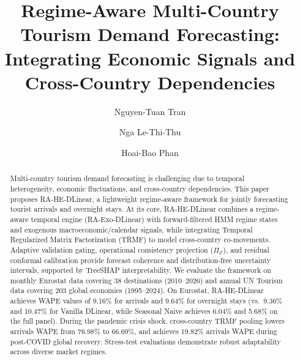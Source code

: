 \documentclass[sigconf]{acmart}
\begin{document}
\title[Regime-Aware Multi-Country Tourism Demand Forecasting]{Regime-Aware Multi-Country Tourism Demand Forecasting: Integrating Economic Signals and Cross-Country Dependencies}

\author{Nguyen-Tuan Tran}

\author{Nga Le-Thi-Thu}

\author{Hoai-Bao Phan}

\renewcommand{\shortauthors}{Tran et al.}

\begin{abstract}
Multi-country tourism demand forecasting is challenging due to temporal heterogeneity, economic fluctuations, and cross-country dependencies. This paper proposes RA-HE-DLinear, a lightweight regime-aware framework for jointly forecasting tourist arrivals and overnight stays. At its core, RA-HE-DLinear combines a regime-aware temporal engine (RA-Exo-DLinear) with forward-filtered HMM regime states and exogenous macroeconomic/calendar signals, while integrating Temporal Regularized Matrix Factorization (TRMF) to model cross-country co-movements. Adaptive validation gating, operational consistency projection ($\Pi_{\mathcal{C}}$), and residual conformal calibration provide forecast coherence and distribution-free uncertainty intervals, supported by TreeSHAP interpretability. We evaluate the framework on monthly Eurostat data covering 38 destinations (2010--2026) and annual UN Tourism data covering 203 global economies (1995--2024). On Eurostat, RA-HE-DLinear achieves WAPE values of 9.16\% for arrivals and 9.64\% for overnight stays (vs.\ 9.36\% and 10.47\% for Vanilla DLinear, while Seasonal Naive achieves 6.04\% and 5.68\% on the full panel). During the pandemic crisis shock, cross-country TRMF pooling lowers arrivals WAPE from 76.98\% to 66.69\%, and achieves 19.82\% arrivals WAPE during post-COVID global recovery. Stress-test evaluations demonstrate robust adaptability across diverse market regimes.
\end{abstract}
\end{document}
